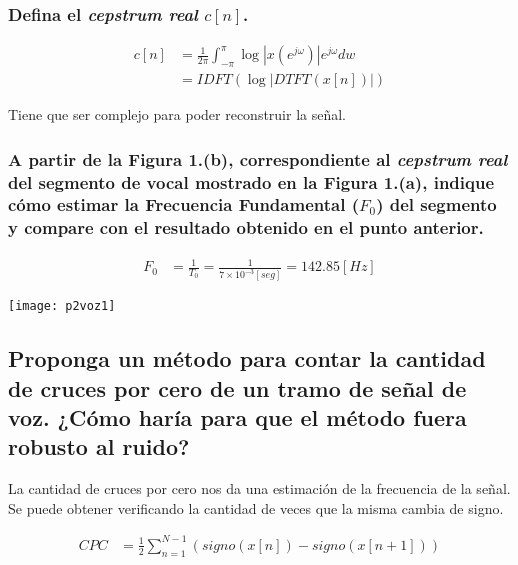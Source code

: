 \documentclass[a4paper,10pt,spanish,oneside]{article}
\begin{document}
\begin{minipage}{0.5\linewidth}

\subsubsection{Defina el \textit{cepstrum real} $c[n]$.}

\begin{align*}
c[n] &= \frac{1}{2\pi}\int_{-\pi}^{\pi}\log|x(e^{j\omega})|e^{j\omega}dw \\
&= IDFT(\log|DTFT(x[n])|)
\end{align*}

Tiene que ser complejo para poder reconstruir la señal.

\subsubsection{A partir de la Figura 1.(b), correspondiente al \textit{cepstrum real} del segmento de vocal mostrado en la Figura 1.(a), indique cómo estimar la Frecuencia Fundamental ($F_{0}$) del segmento y compare con el resultado obtenido en el punto anterior.}

\begin{align*}
F_{0} &= \frac{1}{T_{0}}=\frac{1}{7\times 10^{-3}[seg]}=142.85[Hz]
\end{align*}

\end{minipage} \hfill \begin{minipage}{0.5\linewidth}

\begin{center}
\texttt{[image: p2voz1]}
\end{center}

\end{minipage}

\subsection{Proponga un método para contar la cantidad de cruces por cero de un tramo de señal de voz. ¿Cómo haría para que el método fuera robusto al ruido?}

La cantidad de cruces por cero nos da una estimación de la frecuencia de la señal. Se puede obtener verificando la cantidad de veces que la misma cambia de signo.

\begin{align*}
CPC &= \frac{1}{2}\sum_{n=1}^{N-1}(signo(x[n])-signo(x[n+1]))
\end{align*}
\end{document}
